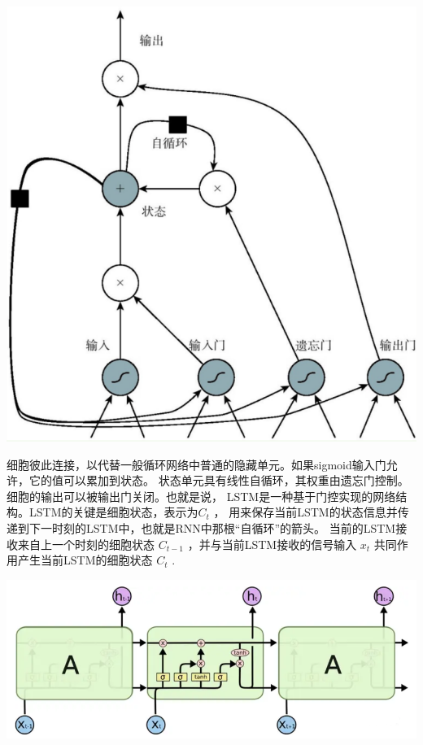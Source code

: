 \documentclass[11pt]{article}
\begin{document}
            \begin{center}
                \includegraphics[scale = 1]{graph/lstm2.png}
            \end{center}

            细胞彼此连接，以代替一般循环网络中普通的隐藏单元。如果sigmoid输入门允许，它的值可以累加到状态。
            状态单元具有线性自循环，其权重由遗忘门控制。细胞的输出可以被输出门关闭。也就是说，
            LSTM是一种基于门控实现的网络结构。LSTM的关键是细胞状态，表示为$C_t$ ，
            用来保存当前LSTM的状态信息并传递到下一时刻的LSTM中，也就是RNN中那根“自循环”的箭头。
            当前的LSTM接收来自上一个时刻的细胞状态 $C_{t-1}$  ，并与当前LSTM接收的信号输入 $x_t$  
            共同作用产生当前LSTM的细胞状态 $C_t$ .

            \begin{center}
                \includegraphics[scale = 0.6]{graph/lstm3.png}
            \end{center}
\end{document}
